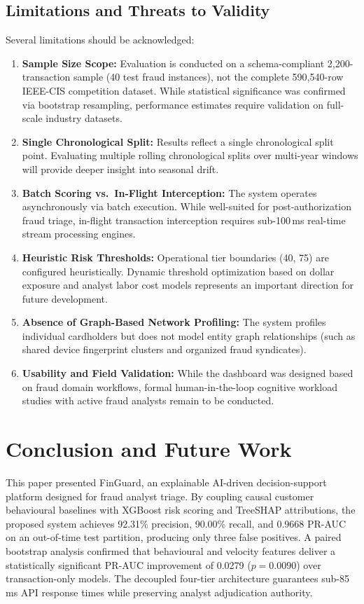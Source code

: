 \documentclass[conference]{IEEEtran}
\begin{document}
\subsection{Limitations and Threats to Validity}
Several limitations should be acknowledged:
\begin{enumerate}
    \item \textbf{Sample Size Scope:} Evaluation is conducted on a schema-compliant 2,200-transaction sample (40 test fraud instances), not the complete 590,540-row IEEE-CIS competition dataset. While statistical significance was confirmed via bootstrap resampling, performance estimates require validation on full-scale industry datasets.
    \item \textbf{Single Chronological Split:} Results reflect a single chronological split point. Evaluating multiple rolling chronological splits over multi-year windows will provide deeper insight into seasonal drift.
    \item \textbf{Batch Scoring vs.\ In-Flight Interception:} The system operates asynchronously via batch execution. While well-suited for post-authorization fraud triage, in-flight transaction interception requires sub-100\,ms real-time stream processing engines.
    \item \textbf{Heuristic Risk Thresholds:} Operational tier boundaries (40, 75) are configured heuristically. Dynamic threshold optimization based on dollar exposure and analyst labor cost models represents an important direction for future development.
    \item \textbf{Absence of Graph-Based Network Profiling:} The system profiles individual cardholders but does not model entity graph relationships (such as shared device fingerprint clusters and organized fraud syndicates).
    \item \textbf{Usability and Field Validation:} While the dashboard was designed based on fraud domain workflows, formal human-in-the-loop cognitive workload studies with active fraud analysts remain to be conducted.
\end{enumerate}

\section{Conclusion and Future Work}

This paper presented FinGuard, an explainable AI-driven decision-support platform designed for fraud analyst triage. By coupling causal customer behavioural baselines with XGBoost risk scoring and TreeSHAP attributions, the proposed system achieves 92.31\% precision, 90.00\% recall, and 0.9668 PR-AUC on an out-of-time test partition, producing only three false positives. A paired bootstrap analysis confirmed that behavioural and velocity features deliver a statistically significant PR-AUC improvement of 0.0279 ($p = 0.0090$) over transaction-only models. The decoupled four-tier architecture guarantees sub-85\,ms API response times while preserving analyst adjudication authority.
\end{document}
